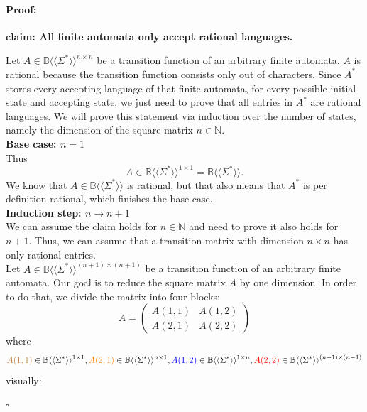 \documentclass[12pt,letterpaper]{article}
\newenvironment{proof}{\paragraph{Proof:}}{\hfill$\square$}
\newcommand{\fps}[1] {
\mathbb{#1}\langle \langle \Sigma^* \rangle \rangle
}
\begin{document}
\begin{proof}
  \begin{center}
    {\bf claim: All finite automata only accept rational languages.}
  \end{center}
  Let $A \in \fps{B}^{n \times n}$ be a transition function of an
  arbitrary finite automata. $A$ is rational because the transition
  function consists only out of characters. Since $A^*$ stores every accepting
  language of that finite automata, for every possible initial
  state and accepting state, we just need to prove that all entries
  in $A^*$ are rational languages.
  We will prove this statement via induction over the number of 
  states, namely the dimension of the square matrix $n \in \mathbb{N}$.\\
  {\bf Base case: $n=1$}\\
  Thus
  \[
    A \in \fps{B}^{1 \times 1} = \fps{B}.
  \]
We know that $A \in \fps{B}$ is rational, but that also means  that $A^*$ is per definition rational, which finishes the base case.\\
{\bf Induction step: $n \to n+1$}\\
We can assume the claim holds for $n \in \mathbb{N}$ and need to prove it
also holds for $n+1$. Thus, we can assume that a transition matrix with
dimension $n \times n$ has only rational entries. \\
Let $A \in \fps{B}^{(n+1) \times (n+1)}$ be a transition function of an
arbitrary finite automata. 
Our goal is to reduce the square matrix $A$ by one dimension.
In order to do that, we divide the matrix into four blocks:
\[
  A = 
  \begin{pmatrix}
    A(1,1) & A(1,2) \\
    A(2,1) & A(2,2)
  \end{pmatrix}
\]
where 
\[ 
  \textcolor{brown}{ A(1,1) }\in \fps{B}^{1 \times 1},
  \textcolor{orange}{ A(2,1)} \in \fps{B}^{n \times 1}, 
  \textcolor{blue}{A(1,2)} \in \fps{B}^{1 \times n},
  \textcolor{red}{A(2,2)} \in \fps{B}^{(n-1) \times (n-1)}
\]
visually:
\begin{center}
\end{center}
\end{proof}
\end{document}
